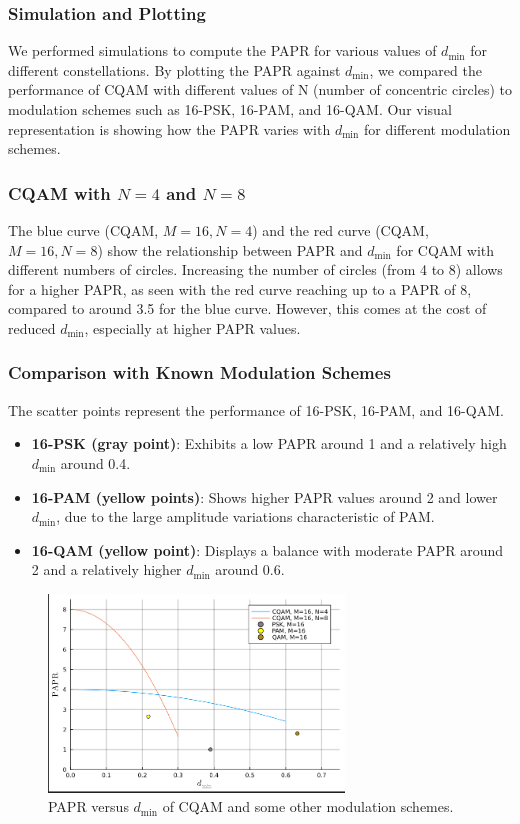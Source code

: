 \documentclass[11pt,a4paper,oneside]{article}
\begin{document}
\subsubsection{Simulation and Plotting}
We performed simulations to compute the PAPR for various values of $d_{\text{min}}$ for different constellations.
By plotting the PAPR against $d_{\text{min}}$, we compared the performance of CQAM with different values of N (number of concentric circles) to 
modulation schemes such as 16-PSK, 16-PAM, and 16-QAM.
Our visual representation is showing how the PAPR varies with $d_{\text{min}}$ for different modulation schemes.

\subsubsection{CQAM with \(N=4\) and \(N=8\)}
The blue curve (CQAM, \(M=16, N=4\)) and the red curve (CQAM, \(M=16, N=8\)) show the relationship between PAPR and \(d_{\text{min}}\)
for CQAM with different numbers of circles. Increasing the number of circles (from 4 to 8) allows for a higher PAPR, as seen with the red curve reaching up to a PAPR of 8,
compared to around 3.5 for the blue curve. However, this comes at the cost of reduced \(d_{\text{min}}\), especially at higher PAPR values.

\subsubsection{Comparison with Known Modulation Schemes}
The scatter points represent the performance of 16-PSK, 16-PAM, and 16-QAM.
\begin{itemize}
    \item \textbf{16-PSK (gray point)}: Exhibits a low PAPR around 1 and a relatively high \(d_{\text{min}}\) around 0.4.
    \item \textbf{16-PAM (yellow points)}: Shows higher PAPR values around 2 and lower \(d_{\text{min}}\), due to the large amplitude variations characteristic of PAM.
    \item \textbf{16-QAM (yellow point)}: Displays a balance with moderate PAPR around 2 and a relatively higher \(d_{\text{min}}\) around 0.6.
\end{itemize}


\begin{figure}[H]
    \centering
    \includegraphics[width=0.7\textwidth]{plot_fig1.png}
    \caption{PAPR versus $d_{\text{min}}$ of CQAM and some other modulation schemes.}
    \label{fig:papr_vs_dmin}
\end{figure}
\end{document}
